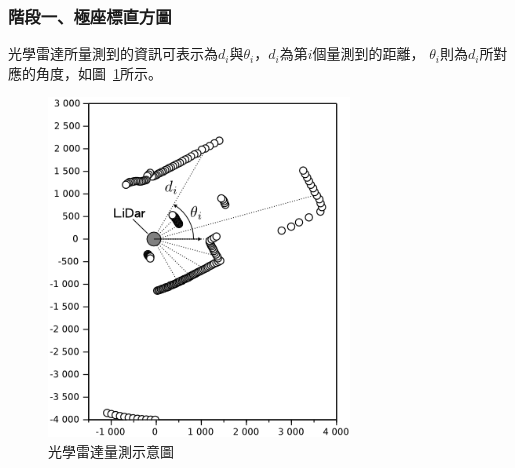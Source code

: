 \subsubsection{階段一、極座標直方圖}
光學雷達所量測到的資訊可表示為$d_i$與$\theta_i$，$d_i$為第$i$個量測到的距離，
$\theta_i$則為$d_i$所對應的角度，如圖~\ref{f:LiDar_measurement}所示。
\begin{figure}[h!]
	\centering
	\includegraphics[width=8cm]{figures/algorithm/LiDar_measurement}
	\caption{光學雷達量測示意圖}
	\label{f:LiDar_measurement}
\end{figure}

